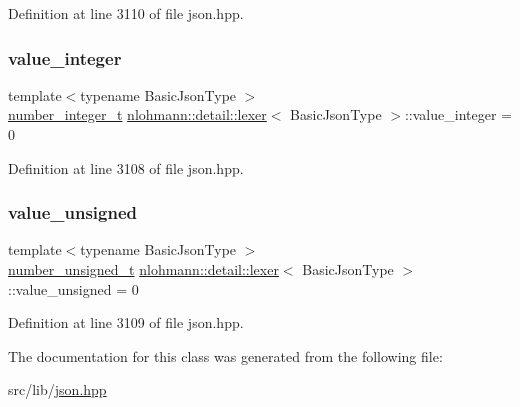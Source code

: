 Definition at line 3110 of file json.\+hpp.

\mbox{\label{classnlohmann_1_1detail_1_1lexer_a353d8eeca5b2f21b3e88540c17afb9bc}} 
\subsubsection{\texorpdfstring{value\+\_\+integer}{value\_integer}}
{\footnotesize\ttfamily template$<$typename Basic\+Json\+Type $>$ \\
\hyperlink{classnlohmann_1_1detail_1_1lexer_a9cd1b11cc67edbfb2613c788b5bd337c}{number\+\_\+integer\+\_\+t} \hyperlink{classnlohmann_1_1detail_1_1lexer}{nlohmann\+::detail\+::lexer}$<$ Basic\+Json\+Type $>$\+::value\+\_\+integer = 0\hspace{0.3cm}{\ttfamily [private]}}



Definition at line 3108 of file json.\+hpp.

\mbox{\label{classnlohmann_1_1detail_1_1lexer_af250180459c23ca71c3e10a99fb5ba3e}} 
\subsubsection{\texorpdfstring{value\+\_\+unsigned}{value\_unsigned}}
{\footnotesize\ttfamily template$<$typename Basic\+Json\+Type $>$ \\
\hyperlink{classnlohmann_1_1detail_1_1lexer_a105d1dfeab414a572655895cdd96a52a}{number\+\_\+unsigned\+\_\+t} \hyperlink{classnlohmann_1_1detail_1_1lexer}{nlohmann\+::detail\+::lexer}$<$ Basic\+Json\+Type $>$\+::value\+\_\+unsigned = 0\hspace{0.3cm}{\ttfamily [private]}}



Definition at line 3109 of file json.\+hpp.



The documentation for this class was generated from the following file\+:\begin{DoxyCompactItemize}
\item 
src/lib/\hyperlink{json_8hpp}{json.\+hpp}\end{DoxyCompactItemize}
